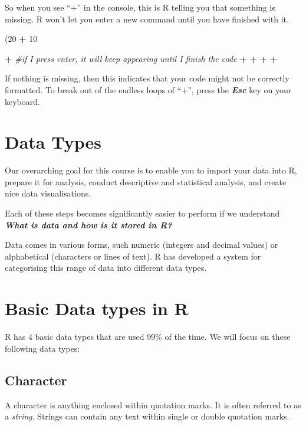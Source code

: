 \documentclass[
]{book}
\newenvironment{Shaded}{\begin{snugshade}}{\end{snugshade}}
\newcommand{\CommentTok}[1]{\textcolor[rgb]{0.56,0.35,0.01}{\textit{#1}}}
\newcommand{\DecValTok}[1]{\textcolor[rgb]{0.00,0.00,0.81}{#1}}
\newcommand{\NormalTok}[1]{#1}
\newcommand{\SpecialCharTok}[1]{\textcolor[rgb]{0.81,0.36,0.00}{\textbf{#1}}}
\begin{document}
So when you see ``+'' in the console, this is R telling you that something is missing. R won't let you enter a new command until you have finished with it.

\begin{Shaded}
\begin{Highlighting}[]
\NormalTok{(}\DecValTok{20} \SpecialCharTok{+} \DecValTok{10}

\SpecialCharTok{+} \CommentTok{\#if I press enter, it will keep appearing until I finish the code}
\SpecialCharTok{+}
\SpecialCharTok{+}
\SpecialCharTok{+}
\SpecialCharTok{+}
\end{Highlighting}
\end{Shaded}

If nothing is missing, then this indicates that your code might not be correctly formatted. To break out of the endless loops of ``+'', press the \textbf{\emph{Esc}} key on your keyboard.

\section{Data Types}\label{data-types}

Our overarching goal for this course is to enable you to import your data into R, prepare it for analysis, conduct descriptive and statistical analysis, and create nice data visualisations.

Each of these steps becomes significantly easier to perform if we understand \textbf{\emph{What is data and how is it stored in R?}}

Data comes in various forms, such numeric (integers and decimal values) or alphabetical (characters or lines of text). R has developed a system for categorising this range of data into different data types.

\section{Basic Data types in R}\label{basic-data-types-in-r}

R has 4 basic data types that are used 99\% of the time. We will focus on these following data types:

\subsection{Character}\label{character}

A character is anything enclosed within quotation marks. It is often referred to as a \emph{string}. Strings can contain any text within single or double quotation marks.
\end{document}
